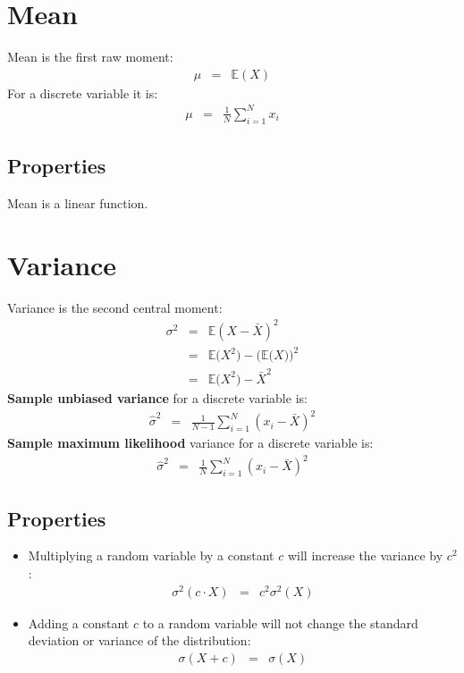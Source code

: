 \section{Mean}
Mean is the first raw moment:
\begin{eqnarray}
	\mu &=& \mathbb{E}(X)
\end{eqnarray}
For a discrete variable it is:
\begin{eqnarray}
	\mu &=& \frac{1}{N}\sum_{i = 1}^{N}x_{i}
\end{eqnarray}

\subsection{Properties}
Mean is a linear function.

\section{Variance}
Variance is the second central moment:
\begin{eqnarray}
	\sigma^{2} &=& \mathbb{E}(X - \bar{X})^{2}\\
			   &=& \mathbb{E}\Big(X^{2}\Big) - \Big(\mathbb{E}\big(X\big)\Big)^{2}\\
			   &=& \mathbb{E}\Big(X^{2}\Big) - \bar{X}^{2}
\end{eqnarray}
\textbf{\color{blue}Sample unbiased variance} for a discrete variable is:
\begin{eqnarray}
	\hat{\sigma}^{2} &=& \frac{1}{N - 1}\sum_{i = 1}^{N}(x_{i} - \bar{X})^{2}
\end{eqnarray}
\textbf{\color{blue}Sample maximum likelihood} variance for a discrete variable is:
\begin{eqnarray}
	\hat{\sigma}^{2} &=& \frac{1}{N}\sum_{i = 1}^{N}(x_{i} - \bar{X})^{2}
\end{eqnarray}

\subsection{Properties}
\begin{itemize}
	\item Multiplying a random variable by a constant $c$ will increase the variance by $c^{2}$:
	\begin{eqnarray}
	\sigma^{2}(c\cdot X) &=& c^{2}\sigma^{2}(X)
	\end{eqnarray}
	\item Adding a constant $c$ to a random variable will not change the standard deviation or variance of the distribution:
	\begin{eqnarray}
		\sigma(X + c) &=& \sigma(X)
	\end{eqnarray} 
\end{itemize}

